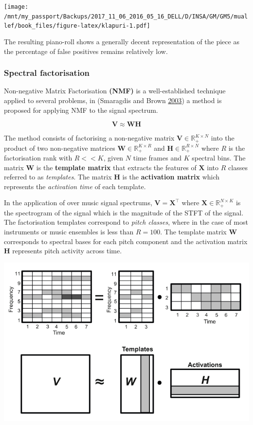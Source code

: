 \documentclass[
  american,
]{article}
\begin{document}
\texttt{[image: /mnt/my\_passport/Backups/2017\_11\_06\_2016\_05\_16\_DELL/D/INSA/GM/GM5/muallef/book\_files/figure-latex/klapuri-1.pdf]}

The resulting piano-roll shows a generally decent
representation of the piece as the percentage
of false positives remains relatively low.

\hypertarget{spectral-factorisation}{%
\subsubsection{Spectral factorisation}\label{spectral-factorisation}}

Non-negative Matrix Factorisation \textbf{(NMF)} is a well-established
technique applied to several problems, in (Smaragdis and Brown \protect\hyperlink{ref-NNMF}{2003}) a method
is proposed for applying NMF to the signal spectrum.

\[\boldsymbol{V}\approx\boldsymbol{W}\boldsymbol{H}\]

The method consists of factorising a non-negative matrix
\(\boldsymbol{V}\in\mathbb{R}_+^{K\times N}\) into the product of two non-negative matrices
\(\boldsymbol{W}\in\mathbb{R}_+^{K\times R}\) and \(\boldsymbol{H}\in\mathbb{R}_+^{R\times N}\) where \(R\)
is the factorisation rank with \(R<<K\), given \(N\) time frames
and \(K\) spectral bins.
The matrix \(\boldsymbol{W}\) is the \textbf{template matrix} that extracts the features
of \(\boldsymbol{X}\) into \(R\) classes referred to as \emph{templates}.
The matrix \(\boldsymbol{H}\) is the \textbf{activation matrix} which represents
the \emph{activation time} of each template.

In the application of over music signal spectrums, \(\boldsymbol{V}={\boldsymbol{X}}^{\top}\)
where \(\boldsymbol{X}\in\mathbb{R}_+^{N\times K}\) is the spectrogram of the signal
which is the magnitude of the STFT of the signal.
The factorisation templates correspond to \emph{pitch classes},
where in the case of most instruments or music ensembles is less than \(R=100\).
The template matrix \(\boldsymbol{W}\) corresponds to spectral bases for each pitch
component and the activation matrix \(\boldsymbol{H}\) represents pitch activity
across time.

\includegraphics{img/nmf.png}
\end{document}
